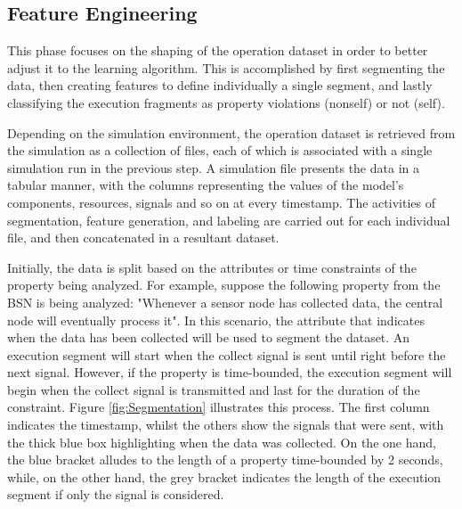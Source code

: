 

\subsection{Feature Engineering}

This phase focuses on the shaping of the operation dataset in order to better adjust it to the learning algorithm. This is accomplished by first segmenting the data, then creating features to define individually a single segment, and lastly classifying the execution fragments as property violations (nonself) or not (self). 

Depending on the simulation environment, the operation dataset is retrieved from the simulation as a collection of files, each of which is associated with a single simulation run in the previous step. A simulation file presents the data in a tabular manner, with the columns representing the values of the model's components, resources, signals and so on at every timestamp. The activities of segmentation, feature generation, and labeling are carried out for each individual file, and then concatenated in a resultant dataset.

Initially, the data is split based on the attributes or time constraints of the property being analyzed. For example, suppose the following property from the BSN is being analyzed: "Whenever a sensor node has collected data, the central node will eventually process it". In this scenario, the attribute that indicates when the data has been collected will be used to segment the dataset. An execution segment will start when the collect signal is sent until right before the next signal. However, if the property is time-bounded, the execution segment will begin when the collect signal is transmitted and last for the duration of the constraint. Figure \ref{fig:Segmentation} illustrates this process. The first column indicates the timestamp, whilst the others show the signals that were sent, with the thick blue box highlighting when the data was collected. On the one hand, the blue bracket alludes to the length of a property time-bounded by 2 seconds, while, on the other hand, the grey bracket indicates the length of the execution segment if only the signal is considered.


